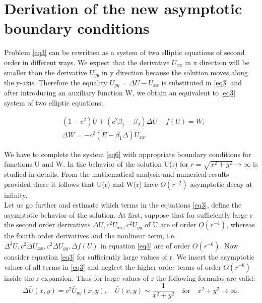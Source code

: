 \documentclass[12pt]{article}
\theoremstyle{theorem}
\theoremstyle{defi}
\begin{document}
\section{Derivation of the new asymptotic boundary conditions }

Problem \eqref{eq3} can be rewritten as a system of two elliptic equations of second order in different ways. We expect that the derivative  $U_{xx}$ in x direction will be smaller than the derivative $U_{yy}$  in y direction because the solution moves along the y-axis. Therefore the equality $U_{yy} = \Delta U - U_{xx}$  is substituted in \eqref{eq3} and after introducing an auxiliary function W, we obtain an equivalent to \eqref{eq3} system of two elliptic equations:

\begin{equation}\label{eq6}
\begin{split}
&(1-c^2) U + ( c^2\beta_1 -  \beta_2) \Delta U  - f (U) = W, \\ 
&\Delta W =  -c^2  (E- \beta_1 \Delta) U_{xx}. 
\end{split}
\end{equation}

We have to complete the system \eqref{eq6} with appropriate boundary conditions for functions U and W. In \cite{ref6} the behavior of the solution U(r) for  $ r=\sqrt{x^2 + y^2}\rightarrow \infty$ is studied in details. From the mathematical analysis and numerical results provided there it follows that U(r) and W(r) have  $O(r^{-2})$ asymptotic decay at infinity. 
\\
	Let us go further and estimate which terms in the equations \eqref{eq3},  define the asymptotic behavior of the solution. At first, suppose that for sufficiently large r the second order derivatives $\Delta U , c^2U_{xx} , c^2U_{yy}$  of U are of order  $O(r^{-4})$, whereas the fourth order derivatives and the nonlinear term, i.e.  $\Delta^2 U , c^2\Delta U_{xx} , c^2\Delta U_{yy}, \Delta f(U)$    in equation \eqref{eq3} are of order $O(r^{-6})$.  
Now consider equation \eqref{eq3} for sufficiently large values of r. We insert the asymptotic values of all terms in \eqref{eq3} and neglect the higher order terms of order $O(r^{-6})$ inside the r-expansion. Thus for large values of r the following formulas are valid:
\begin{equation}
 \Delta \bar{U}(x,y) =   c^2   \bar{U}_{yy}(x,y) , \quad  \bar{U}(x,y) \sim \frac{1}{x^2 + y^2} \quad \text{for} \quad x^2 + y^2 \rightarrow \infty  . \label{eq8}
\end{equation}
\end{document}
